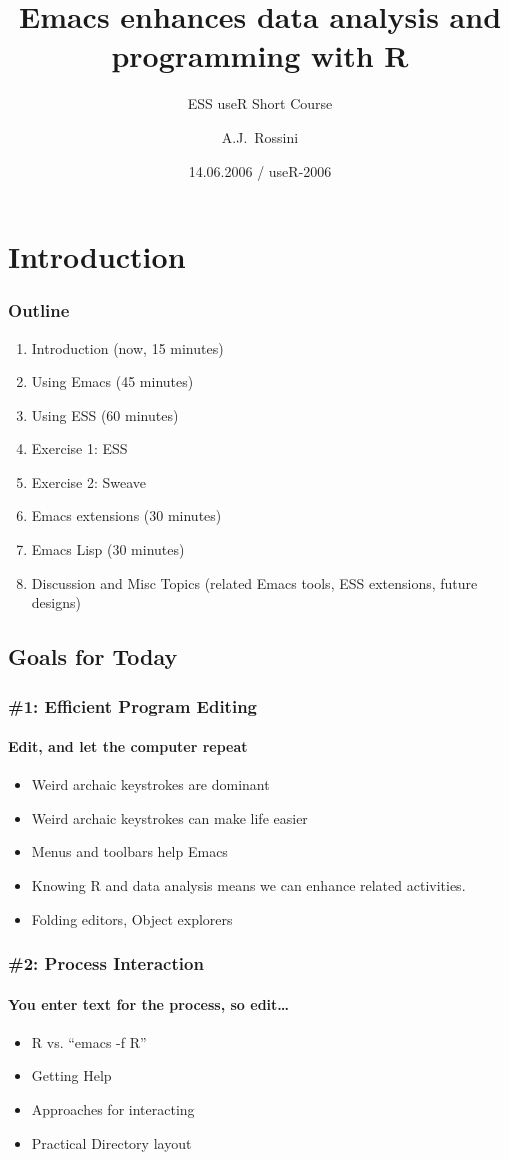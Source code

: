 \documentclass{beamer}
\title[Emacs and R]{Emacs enhances data analysis and programming with R}
\subtitle{ESS useR Short Course}
\author[Rossini]{A.J.~Rossini}
\institute[Novartis Pharma AG]
{
  Modeling and Simulation \\
  Novartis Pharma AG \\
  Basel, Switzerland
}
\date[14.06.2006]
{14.06.2006 / useR-2006}
\begin{document}
\begin{frame}
  \titlepage
\end{frame}

\section{Introduction}

\begin{frame}
  \frametitle{Outline}
  \begin{enumerate}
  \item Introduction (now, 15 minutes)
  \item Using Emacs (45 minutes)
  \item Using ESS (60 minutes)
  \item Exercise 1: ESS
  \item Exercise 2: Sweave
  \item Emacs extensions (30 minutes)
  \item Emacs Lisp (30 minutes)
  \item Discussion and Misc Topics (related Emacs tools, ESS extensions, future designs)
  \end{enumerate}
\end{frame}

\subsection[Goals]{Goals for Today}

\begin{frame}
  \frametitle{\#1: Efficient Program Editing}
  \framesubtitle{Edit, and let the computer repeat}
  \begin{itemize}
  \item Weird archaic keystrokes are dominant
  \item Weird archaic keystrokes can make life easier
  \item Menus and toolbars help Emacs
  \item Knowing R and data analysis means we can enhance related activities.
  \item Folding editors, Object explorers
  \end{itemize}
\end{frame}

\begin{frame}
  \frametitle{\#2: Process Interaction}
  \framesubtitle{You enter text for the process, so edit\ldots}
  \begin{itemize}
  \item R vs. ``emacs -f R''
  \item Getting Help
  \item Approaches for interacting
  \item Practical Directory layout
  \end{itemize}
\end{frame}
\end{document}
